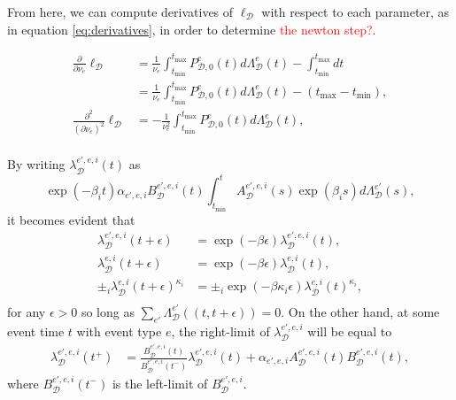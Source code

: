 \documentclass[honours,12pt]{unswthesis}
\numberwithin{equation}{section}
\begin{document}
From here, we can compute derivatives of $\ell_\mathcal{D}$ with respect to each parameter, as in equation \eqref{eq:derivatives}, in order to determine \textcolor{red}{the newton step?}.

\begin{equation}
	\begin{align}
		\frac{\partial}{\partial \nu_e}\ell_\mathcal{D} &= \frac{1}{\nu_e} \int_{t_\mathrm{min}}^{t_\mathrm{max}} P_{\mathcal{D},0}^e(t)d\Lambda_\mathcal{D}^e(t) - \int_{t_\mathrm{min}}^{t_\mathrm{max}} dt \\
		&= \frac{1}{\nu_e} \int_{t_\mathrm{min}}^{t_\mathrm{max}} P_{\mathcal{D},0}^e(t)d\Lambda_\mathcal{D}^e(t) - (t_\mathrm{max}-t_\mathrm{min}), \\
		\frac{\partial^2}{(\partial \nu_e)^2}\ell_\mathcal{D} &= -\frac{1}{\nu_e^2} \int_{t_\mathrm{min}}^{t_\mathrm{max}} P_{\mathcal{D},0}^e(t)d\Lambda_\mathcal{D}^e(t), \\
	\end{align}
\end{equation}

By writing $\lambda_\mathcal{D}^{e',e,i}(t)$ as
$$\exp(-\beta_i t)\alpha_{e',e,i} B_\mathcal{D}^{e',e,i}(t)\int_{t_\mathrm{min}}^t A_\mathcal{D}^{e',e,i}(s) \exp(\beta_i s)d\Lambda_\mathcal{D}^{e'}(s),$$
it becomes evident that 
\begin{equation*}
	\begin{align}
		\lambda_\mathcal{D}^{e',e,i}(t+\epsilon) &= \exp(-\beta\epsilon) \lambda_\mathcal{D}^{e',e,i}(t), \\
		\lambda_\mathcal{D}^{e,i}(t+\epsilon) &= \exp(-\beta\epsilon) \lambda_\mathcal{D}^{e,i}(t), \\
		\pm_i\lambda_\mathcal{D}^{e,i}(t+\epsilon)^{\kappa_i} &= \pm_i \exp(-\beta\kappa_i\epsilon) \lambda_\mathcal{D}^{e,i}(t)^{\kappa_i}, \\
	\end{align}
\end{equation*}
for any $\epsilon>0$ so long as $\sum_{e'}\Lambda_\mathcal{D}^{e'}((t,t+\epsilon))=0$.
On the other hand, at some event time $t$ with event type $e$, the right-limit of $\lambda_\mathcal{D}^{e',e,i}$ will be equal to
\begin{equation}
	\begin{align}
		\lambda_\mathcal{D}^{e',e,i}(t^+) &= \frac{B_\mathcal{D}^{e',e,i}(t)}{B_\mathcal{D}^{e',e,i}(t^-)}\lambda_\mathcal{D}^{e',e,i}(t) + \alpha_{e',e,i} A_\mathcal{D}^{e',e,i}(t)B_\mathcal{D}^{e',e,i}(t),
	\end{align}
\end{equation}
where $B_\mathcal{D}^{e',e,i}(t^-)$ is the left-limit of $B_\mathcal{D}^{e',e,i}$.
\end{document}
